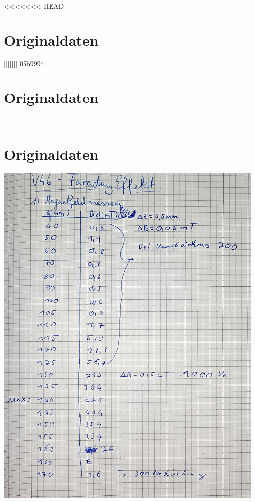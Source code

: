 <<<<<<< HEAD
\section*{Originaldaten}
\label{sec:Originaldaten}

||||||| 05b9994
\section{Originaldaten}
\label{sec:Originaldaten}
=======
\section{Originaldaten}
\label{sec:Originaldaten}

\includegraphics[width=\textwidth,page=1]{Bilder/v46originaldaten.pdf}
